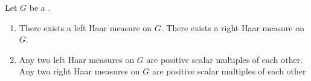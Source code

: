 
\begin{lemma} \label{lemma:left_haar_measures_on_a_locally_compact_group_are_unique_up_to_scalars}
    Let $G$ be a . 
    \begin{enumerate}
        \item There exists a left Haar measure on $G$. There exists a right Haar measure on $G$.
        \item Any two left Haar measures on $G$ are positive scalar multiples of each other. Any two right Haar measures on $G$ are positive scalar multiples of each other
    \end{enumerate}
\end{lemma}
